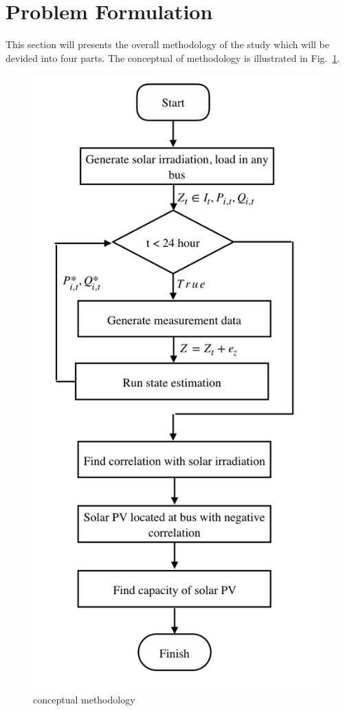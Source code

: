 \section{Problem Formulation}
  This section will presents the overall methodology of the study which will be devided into four parts.
  The conceptual of methodology is illustrated in Fig.~\ref{fig.method}.

  \begin{figure}[h!]
    \center
    \includegraphics[scale=0.5]{images/conceptual_methodology.png}
    \caption{conceptual methodology}
    \label{fig.method}
  \end{figure}

